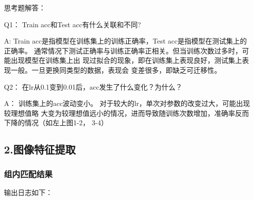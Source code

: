 \documentclass{article}
\begin{document}
    思考题解答：

    Q1： Train acc和Test acc有什么关联和不同?

    A: Train acc是指模型在训练集上的训练正确率，Test acc是指模型在测试集上的正确率。
    通常情况下测试正确率与训练正确率正相关。但当训练次数过多时，可能出现模型在训练集上出
    现过拟合的现象，即在训练集上表现良好，测试集上表现一般。一旦更换同类型的数据，表现会
    变差很多，即缺乏可迁移性。

    Q2： 在lr从0.1变到0.01后，acc发生了什么变化？为什么？

    A： 训练集上的acc波动变小。 对于较大的lr，单次对参数的改变过大，可能出现较理想值略
    大变为较理想值远小的情况，进而导致随训练次数增加，准确率反而下降的情况（如左上图1-2，
    3-4）

\subsection{2.图像特征提取}

\subsubsection{组内匹配结果}

    输出日志如下：
\end{document}
